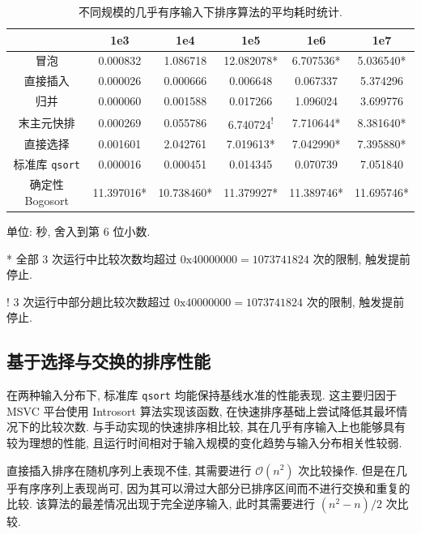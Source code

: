 \documentclass[12pt]{article}
\begin{document}
\begin{table}
\centering
\begin{threeparttable}
    \begin{tabular}{cccccc}
        \toprule
         & 1e3 & 1e4 & 1e5 & 1e6 & 1e7 \\
        \midrule
        冒泡 & 0.000832 & 1.086718 & 12.082078* & 6.707536* & 5.036540* \\
        直接插入 & 0.000026 & 0.000666 & 0.006648 & 0.067337 & 5.374296 \\
        归并 & 0.000060 & 0.001588 & 0.017266 & 1.096024 & 3.699776 \\
        末主元快排 & 0.000269 & 0.055786 & 6.740724\textsuperscript{!} & 7.710644* & 8.381640* \\
        直接选择 & 0.001601 & 2.042761 & 7.019613* & 7.042990* & 7.395880* \\
        标准库 \texttt{qsort} & 0.000016 & 0.000451 & 0.014345 & 0.070739 & 7.051840 \\
        确定性 Bogosort & 11.397016* & 10.738460* & 11.379927* & 11.389746* & 11.695746* \\
        \bottomrule
    \end{tabular}
    \begin{tablenotes}
        \small
        \item 单位: 秒, 舍入到第 6 位小数.
        \item[*] 全部 3 次运行中比较次数均超过 $0\mathrm{x}40000000 = 1073741824$ 次的限制, 触发提前停止.
        \item[!] 3 次运行中部分趟比较次数超过 $0\mathrm{x}40000000 = 1073741824$ 次的限制, 触发提前停止.
    \end{tablenotes}
    \caption{不同规模的几乎有序输入下排序算法的平均耗时统计.}
    \label{table_result_almost_rising}
\end{threeparttable}
\end{table}

\subsection{基于选择与交换的排序性能}

在两种输入分布下, 标准库 \texttt{qsort} 均能保持基线水准的性能表现. 这主要归因于 MSVC 平台使用 Introsort 算法实现该函数, 在快速排序基础上尝试降低其最坏情况下的比较次数. 与手动实现的快速排序相比较, 其在几乎有序输入上也能够具有较为理想的性能, 且运行时间相对于输入规模的变化趋势与输入分布相关性较弱.

直接插入排序在随机序列上表现不佳, 其需要进行 $\mathcal{O}(n^2)$ 次比较操作. 但是在几乎有序序列上表现尚可, 因为其可以滑过大部分已排序区间而不进行交换和重复的比较. 该算法的最差情况出现于完全逆序输入, 此时其需要进行 $(n^2 - n) / 2$ 次比较.
\end{document}
